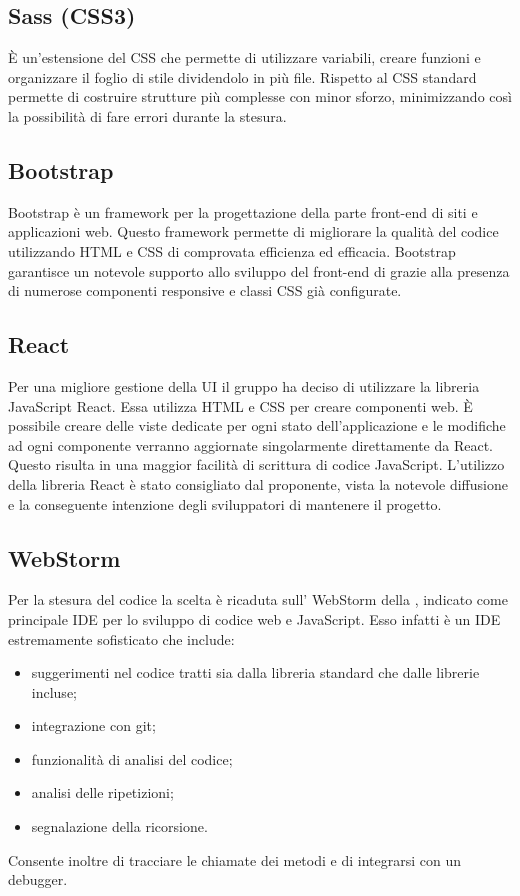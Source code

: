 \subsection{Sass (CSS3)}
È un'estensione del CSS che permette di utilizzare variabili, creare funzioni e organizzare il foglio di stile dividendolo in più file. Rispetto al CSS standard permette di costruire strutture più complesse con minor sforzo, minimizzando così la possibilità di fare errori durante la stesura.

\subsection{Bootstrap}
Bootstrap è un framework per la progettazione della parte front-end di siti e applicazioni web. Questo framework permette di migliorare la qualità del codice utilizzando  HTML e CSS di comprovata efficienza ed efficacia. Bootstrap garantisce un notevole supporto allo sviluppo del front-end di \ProjectName{} grazie alla presenza di numerose componenti responsive e classi CSS già configurate.

\subsection{React}
Per una migliore gestione della UI il gruppo ha deciso di utilizzare la libreria JavaScript React. Essa utilizza HTML e CSS per creare componenti web. È possibile creare delle viste dedicate per ogni stato dell'applicazione e le modifiche ad ogni componente verranno aggiornate singolarmente direttamente da React. Questo risulta in una maggior facilità di scrittura di codice JavaScript. L'utilizzo della libreria React è stato consigliato dal proponente, vista la notevole diffusione e la conseguente intenzione degli sviluppatori di mantenere il progetto.

\subsection{WebStorm}
Per la stesura del codice la scelta è ricaduta sull' WebStorm della , indicato come principale IDE per lo sviluppo di codice web e JavaScript. Esso infatti è un IDE estremamente sofisticato che include:
\begin{itemize}
	\item suggerimenti nel codice tratti sia dalla libreria standard che dalle librerie incluse;
	\item integrazione con git;
	\item funzionalità di analisi del codice;
	\item analisi delle ripetizioni;
	\item segnalazione della ricorsione.
\end{itemize}
Consente inoltre di tracciare le chiamate dei metodi e di integrarsi con un debugger.
